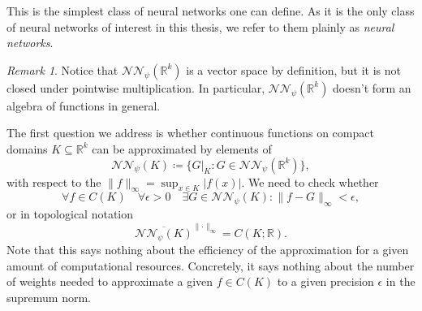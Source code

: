\documentclass[11pt,a4paper,twoside,openany]{report}
\numberwithin{equation}{section}
\theoremstyle{plain} %
\theoremstyle{definition} %
\theoremstyle{remark} %
\newtheorem{remark}[theorem]{Remark}
\begin{document}
This is the simplest class of neural networks one can define. As it is the only class of neural networks of interest in this thesis, we refer to them plainly as \textit{neural networks}. 
\begin{remark}\label{rem:NN don't form algebra}
    Notice that \(\mathcal{NN}_{\psi}(\mathbb{R}^k)\) is a vector space by definition, but it is not closed under pointwise multiplication. In particular, \(\mathcal{NN}_{\psi}(\mathbb{R}^k)\) doesn't form an algebra of functions in general.
\end{remark}
The first question we address is whether continuous functions on compact domains \(K\subseteq\mathbb{R}^k\) can be approximated by elements of 
\begin{equation*}
    \mathcal{NN}_{\psi}(K)\coloneqq \Big\{G|_K:G\in\mathcal{NN}_{\psi}(\mathbb{R}^k)\Big\},
\end{equation*}
with respect to the \(\lVert f\rVert_{\infty}=\sup_{x\in K}|f(x)|\). We need to check whether
\begin{equation*}
    \forall{f}\in C(K)\quad\forall\epsilon>0\quad\exists G\in\mathcal{NN}_{\psi}(K):\lVert f-G\rVert_{\infty}<\epsilon,
\end{equation*}
or in topological notation
\begin{equation}\label{eq:density of NN in C(K)}
    \overline{\mathcal{NN}_{\psi}(K)}^{\lVert\cdot\rVert_\infty}=C(K;\mathbb{R}).
\end{equation}
Note that this says nothing about the efficiency of the approximation for a given amount of computational resources. Concretely, it says nothing about the number of weights needed to approximate a given \(f\in C(K)\) to a given precision \(\epsilon\) in the supremum norm. 
\end{document}
